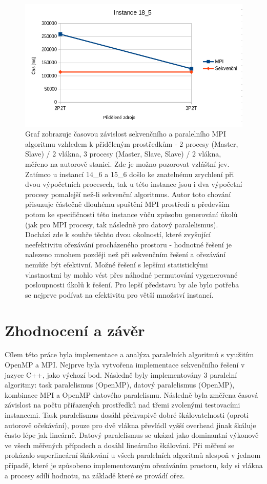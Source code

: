 \documentclass{article}%
\begin{document}
\begin{figure}[H]%
    \centering%
    \includegraphics[width=1\linewidth]{images/mpi_18_5.png}%
    \caption{Graf zobrazuje časovou závislost sekvenčního a paralelního MPI algoritmu vzhledem k přiděleným prostředkům - 2 procesy (Master, Slave) / 2 vlákna, 3 procesy (Master, Slave, Slave) / 2 vlákna, měřeno na autorově stanici. Zde je možno pozorovat vzláštní jev. Zatímco u instancí 14\_6 a 15\_6 došlo ke znatelnému zrychlení při dvou výpočetních procesech, tak u této instance jsou i dva výpočetní procesy pomalejší než-li sekvenční algoritmus. Autor toto chování přisuzuje částečně dlouhému spuštění MPI prostředí a především potom ke specifičnosti této instance vůču způsobu generování úkolů (jak pro MPI procesy, tak následně pro datový paralelismus). Dochází zde k souhře těchto dvou okolností, které zvyšující neefektivitu ořezávání procházeného prostoru - hodnotné řešení je nalezeno mnohem později než při sekvenčním řešení a ořezávání nemůže být efektivní. Možné řešení s lepšími statistickými vlastnostmi by mohlo vést přes náhodné permutování vygenerované posloupnosti úkolů k řešení. Pro lepší představu by ale bylo potřeba se nejprve podívat na efektivitu pro větší množství instancí.}%
\end{figure}

\section{Zhodnocení a závěr}
Cílem této práce byla implementace a analýza paralelních algoritmů s využitím OpenMP a MPI. Nejprve byla vytvořena implementace sekvenčního řešení v jazyce C++, jako výchozí bod. Následně byly implementovány 3 paralelní algoritmy: task paralelismus (OpenMP), datový paralelismus (OpenMP), kombinace MPI a OpenMP datového paralelismu. Následně byla změřena časová závislost na počtu přiřazených prostředků nad třemi zvolenými testovacími instancemi. Task paralelismus dosáhl překvapivě dobré škálovatelnosti (oproti autorově očekávání), pouze pro dvě vlákna převládl vyšší overhead jinak škáluje často lépe jak lineárně. Datový paralelismus se ukázal jako dominantní výkonově ve všech měřených případech a dosáhl lineárního škálování. Při měření se prokázalo superlineární škálování u všech paralelních algoritmů alespoň v jednom případě, které je způsobeno implementovaným ořezáváním prostoru, kdy si vlákna a procesy sdílí hodnotu, na základě které se provádí ořez.
\end{document}

